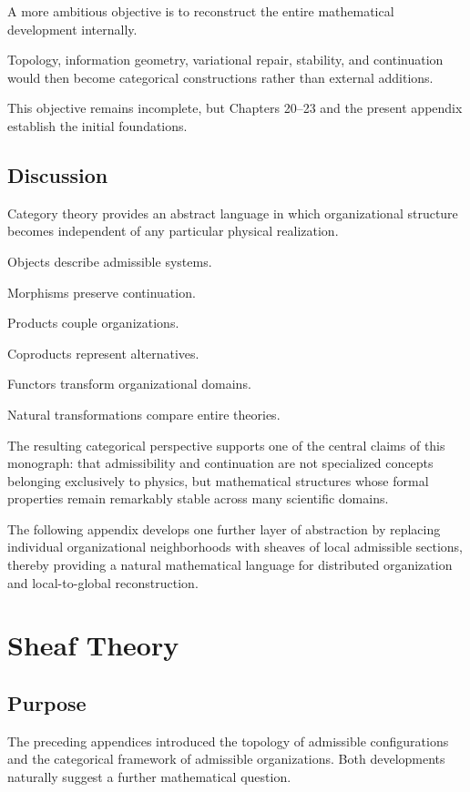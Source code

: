 \documentclass[11pt,oneside]{book}
\numberwithin{equation}{chapter}
\theoremstyle{definition}
\theoremstyle{plain}
\begin{document}
A more ambitious objective is to reconstruct the entire mathematical
development internally.

Topology, information geometry, variational repair, stability, and
continuation would then become categorical constructions rather than
external additions.

This objective remains incomplete, but Chapters 20--23 and the present
appendix establish the initial foundations.

\section{Discussion}

Category theory provides an abstract language in which organizational
structure becomes independent of any particular physical realization.

Objects describe admissible systems.

Morphisms preserve continuation.

Products couple organizations.

Coproducts represent alternatives.

Functors transform organizational domains.

Natural transformations compare entire theories.

The resulting categorical perspective supports one of the central claims
of this monograph: that admissibility and continuation are not
specialized concepts belonging exclusively to physics, but mathematical
structures whose formal properties remain remarkably stable across many
scientific domains.

The following appendix develops one further layer of abstraction by
replacing individual organizational neighborhoods with sheaves of local
admissible sections, thereby providing a natural mathematical language for
distributed organization and local-to-global reconstruction.

\chapter{Sheaf Theory}

\section{Purpose}

The preceding appendices introduced the topology of admissible
configurations and the categorical framework of admissible organizations.
Both developments naturally suggest a further mathematical question.
\end{document}
